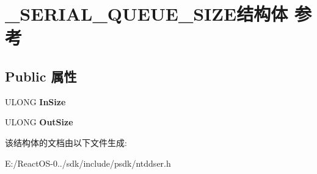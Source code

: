 \hypertarget{struct___s_e_r_i_a_l___q_u_e_u_e___s_i_z_e}{}\section{\+\_\+\+S\+E\+R\+I\+A\+L\+\_\+\+Q\+U\+E\+U\+E\+\_\+\+S\+I\+Z\+E结构体 参考}
\label{struct___s_e_r_i_a_l___q_u_e_u_e___s_i_z_e}
\subsection*{Public 属性}
\begin{DoxyCompactItemize}
\item 
\mbox{\label{struct___s_e_r_i_a_l___q_u_e_u_e___s_i_z_e_a7283fb4d8532ba7c174535930f2bb1ff}} 
U\+L\+O\+NG {\bfseries In\+Size}
\item 
\mbox{\label{struct___s_e_r_i_a_l___q_u_e_u_e___s_i_z_e_aba56def28b6244f9552e23bc85654fad}} 
U\+L\+O\+NG {\bfseries Out\+Size}
\end{DoxyCompactItemize}


该结构体的文档由以下文件生成\+:\begin{DoxyCompactItemize}
\item 
E\+:/\+React\+O\+S-\/0../sdk/include/psdk/ntddser.\+h\end{DoxyCompactItemize}
